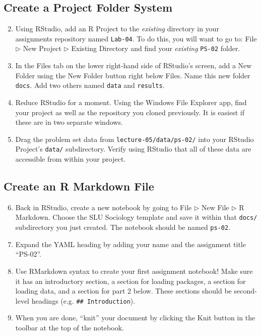 \documentclass{tufte-handout}
\begin{document}
\subsection{Create a Project Folder System}
\begin{enumerate}[label=\alph*.]
\setcounter{enumi}{1}
\item Using RStudio, add an R Project to the \textit{existing} directory in your assignments repository named \texttt{Lab-04}. To do this, you will want to go to: \textsf{File $\triangleright$} {\color{red}\textsf{New Project}} \textsf{$\triangleright$ Existing Directory} and find your \textit{existing} \texttt{PS-02} folder.
\item In the \textsf{Files} tab on the lower right-hand side of RStudio's screen, add a New Folder using the \textsf{New Folder} button right below \textsf{Files}. Name this new folder \texttt{docs}. Add two others named \texttt{data} and \texttt{results}.
\item Reduce RStudio for a moment. Using the Windows File Explorer app, find your project as well as the repository you cloned previously. It is easiest if these are in two separate windows.
\item Drag the problem set data from \texttt{lecture-05/data/ps-02/} into your RStudio Project's \texttt{data/} subdirectory. Verify using RStudio that all of these data are accessible from within your project.
\end{enumerate}

\vspace{3mm}
\subsection{Create an R Markdown File}
\begin{enumerate}[label=\alph*.]
\setcounter{enumi}{5}
\item Back in RStudio, create a new notebook by going to \textsf{File $\triangleright$ New File $\triangleright$} {\color{red}\textsf{R Markdown}}. Choose the SLU Sociology template and save it within that \texttt{docs/} subdirectory you just created. The notebook should be named \texttt{ps-02}.
\item Expand the YAML heading by adding your name and the assignment title ``PS-02''.
\item Use RMarkdown syntax to create your first assignment notebook! Make sure it has an introductory section, a section for loading packages, a section for loading data, and a section for part 2 below. These sections should be second-level headings (e.g. \texttt{\#\# Introduction}). 
\item When you are done, ``knit'' your document by clicking the \textsf{Knit} button in the toolbar at the top of the notebook.
\end{enumerate}
\end{document}
